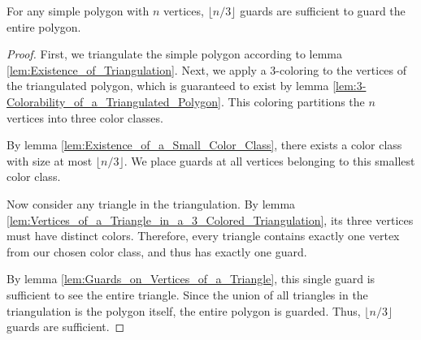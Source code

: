 \begin{theorem}
    \label{thm:Chvatals_Art_Gallery_Theorem}
    For any simple polygon with $n$ vertices, $\lfloor n/3 \rfloor$ guards are sufficient to guard the entire polygon.
\end{theorem}

\begin{proof}
    First, we triangulate the simple polygon according to lemma \ref{lem:Existence_of_Triangulation}. Next, we apply a 3-coloring to the vertices of the triangulated polygon, which is guaranteed to exist by lemma \ref{lem:3-Colorability_of_a_Triangulated_Polygon}. This coloring partitions the $n$ vertices into three color classes.
    
    By lemma \ref{lem:Existence_of_a_Small_Color_Class}, there exists a color class with size at most $\lfloor n/3 \rfloor$. We place guards at all vertices belonging to this smallest color class.
    
    Now consider any triangle in the triangulation. By lemma \ref{lem:Vertices_of_a_Triangle_in_a_3_Colored_Triangulation}, its three vertices must have distinct colors. Therefore, every triangle contains exactly one vertex from our chosen color class, and thus has exactly one guard.
    
    By lemma \ref{lem:Guards_on_Vertices_of_a_Triangle}, this single guard is sufficient to see the entire triangle. Since the union of all triangles in the triangulation is the polygon itself, the entire polygon is guarded. Thus, $\lfloor n/3 \rfloor$ guards are sufficient.
\end{proof}